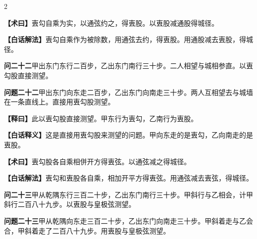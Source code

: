 \documentclass[11pt,a4paper]{article}
\newcommand{\WenQuestion}[1]{\textbf{\textcolor{classicalcolor}{#1}}}
\newcommand{\BaiQuestion}[1]{\textbf{\textcolor{moderncolor}{#1}}}
\newcommand{\WenExplain}{\textcolor{classicalcolor}{\textbf{【释曰】}}}
\newcommand{\BaiExplain}{\textcolor{moderncolor}{\textbf{【白话释义】}}}
\newcommand{\WenMethod}{\textcolor{classicalcolor}{\textbf{【术曰】}}}
\newcommand{\BaiMethod}{\textcolor{moderncolor}{\textbf{【白话解法】}}}
\begin{document}
\begin{paracol}{2}
\switchcolumn*
\begin{tcolorbox}[colback=red!5,colframe=red!40!black,boxrule=0.3pt]
\WenMethod\quad 叀勾自乘为实，以通弦约之，得叀股。以叀股减通股得城径。
\end{tcolorbox}
\switchcolumn
\begin{tcolorbox}[colback=blue!5,colframe=blue!40!black,boxrule=0.3pt]
\BaiMethod\quad 叀勾自乘作为被除数，用通弦去约，得叀股。用通股减去叀股，得城径。
\end{tcolorbox}

\vspace{0.8em}

\switchcolumn*
\begin{tcolorbox}[colback=red!3,colframe=red!30!black,boxrule=0.3pt]
\WenQuestion{问二十二}\quad 甲出东门东行二百步，乙出东门南行三十步。二人相望与城相参直。以叀勾股直接测望。
\end{tcolorbox}
\switchcolumn
\begin{tcolorbox}[colback=blue!3,colframe=blue!30!black,boxrule=0.3pt]
\BaiQuestion{问题二十二}\quad 甲出东门向东走二百步，乙出东门向南走三十步。两人互相望去与城墙在一条直线上。直接用叀勾股测望。
\end{tcolorbox}

\switchcolumn*
\begin{tcolorbox}[colback=red!5,colframe=red!30!black,boxrule=0.3pt]
\WenExplain\quad 此以叀勾股直接测望。甲东行为叀勾，乙南行为叀股。
\end{tcolorbox}
\switchcolumn
\begin{tcolorbox}[colback=blue!5,colframe=blue!30!black,boxrule=0.3pt]
\BaiExplain\quad 这是直接用叀勾股来测望的问题。甲向东走的是叀勾，乙向南走的是叀股。
\end{tcolorbox}

\switchcolumn*
\begin{tcolorbox}[colback=red!5,colframe=red!40!black,boxrule=0.3pt]
\WenMethod\quad 叀勾股各自乘相併开方得叀弦。以通弦减之得城径。
\end{tcolorbox}
\switchcolumn
\begin{tcolorbox}[colback=blue!5,colframe=blue!40!black,boxrule=0.3pt]
\BaiMethod\quad 叀勾和叀股各自乘，相加开平方得叀弦。用通弦减去叀弦，得城径。
\end{tcolorbox}

\vspace{0.8em}

\switchcolumn*
\begin{tcolorbox}[colback=red!3,colframe=red!30!black,boxrule=0.3pt]
\WenQuestion{问二十三}\quad 甲从乾隅东行三百二十步，乙出东门南行三十步。甲斜行与乙相会，计甲斜行二百八十九步。以叀股与皇极弦测望。
\end{tcolorbox}
\switchcolumn
\begin{tcolorbox}[colback=blue!3,colframe=blue!30!black,boxrule=0.3pt]
\BaiQuestion{问题二十三}\quad 甲从乾隅向东走三百二十步，乙出东门向南走三十步。甲斜着走与乙会合，甲斜着走了二百八十九步。用叀股与皇极弦测望。
\end{tcolorbox}


\end{paracol}
\end{document}
